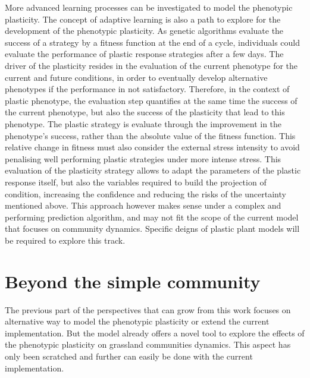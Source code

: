 More advanced learning processes can be investigated to model the phenotypic plasticity. The concept of adaptive learning is also a path to explore for the development of the phenotypic plasticity. As genetic algorithms evaluate the success of a strategy by a fitness function at the end of a cycle, individuals could evaluate the performance of plastic response strategies after a few days. The driver of the plasticity resides in the evaluation of the current phenotype for the current and future conditions, in order to eventually develop alternative phenotypes if the performance in not satisfactory. Therefore, in the context of plastic phenotype, the evaluation step quantifies at the same time the success of the current phenotype, but also the success of the plasticity that lead to this phenotype. The plastic strategy is evaluate through the improvement in the phenotype's success, rather than the absolute value of the fitness function. This relative change in fitness must also consider the external stress intensity to avoid penalising well performing plastic strategies under more intense stress. This evaluation of the plasticity strategy allows to adapt the parameters of the plastic response itself, but also the variables required to build the projection of condition, increasing the confidence and reducing the risks of the uncertainty mentioned above. This approach however makes sense under a complex and performing prediction algorithm, and may not fit the scope of the current model that focuses on community dynamics. Specific deigns of plastic plant models will be required to explore this track.





\section{Beyond the simple community}

The previous part of the perspectives that can grow from this work focuses on alternative way to model the phenotypic plasticity or extend the current implementation. But the model already offers a novel tool to explore the effects of the phenotypic plasticity on grassland communities dynamics. This aspect has only been scratched and further can easily be done with the current implementation.

